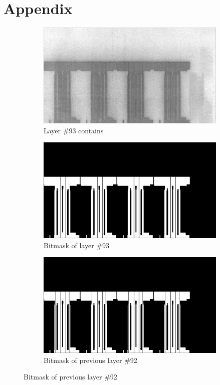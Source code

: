 \section*{Appendix}
\begin{figure}[!h]
  \centering
  \begin{subfigure}{.8\textwidth}
    \centering
    \includegraphics[width=\linewidth]{images/implementation/results/bm/layer_00093}
    \caption{Layer \#93 contains}
  \end{subfigure}

  \begin{subfigure}{.8\textwidth}
    \centering
    \includegraphics[width=\linewidth]{images/implementation/results/bm/bitmask_00093}
    \caption{Bitmask of layer \#93}
  \end{subfigure}

  \begin{subfigure}{.8\textwidth}
    \centering
    \includegraphics[width=\linewidth]{images/implementation/results/bm/bitmask_00092}
    \caption{Bitmask of previous layer \#92}
  \end{subfigure}


\end{figure}
